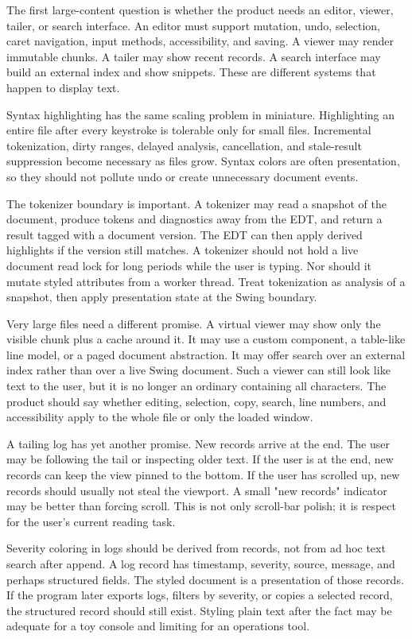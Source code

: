 The first large-content question is whether the product needs an editor, viewer, tailer, or search interface. An editor must support mutation, undo, selection, caret navigation, input methods, accessibility, and saving. A viewer may render immutable chunks. A tailer may show recent records. A search interface may build an external index and show snippets. These are different systems that happen to display text.

Syntax highlighting has the same scaling problem in miniature. Highlighting an entire file after every keystroke is tolerable only for small files. Incremental tokenization, dirty ranges, delayed analysis, cancellation, and stale-result suppression become necessary as files grow. Syntax colors are often presentation, so they should not pollute undo or create unnecessary document events.

The tokenizer boundary is important. A tokenizer may read a snapshot of the
document, produce tokens and diagnostics away from the EDT, and return a result
tagged with a document version. The EDT can then apply derived highlights if
the version still matches. A tokenizer should not hold a live document read lock
for long periods while the user is typing. Nor should it mutate styled
attributes from a worker thread. Treat tokenization as analysis of a snapshot,
then apply presentation state at the Swing boundary.

Very large files need a different promise. A virtual viewer may show only the
visible chunk plus a cache around it. It may use a custom component, a table-like
line model, or a paged document abstraction. It may offer search over an
external index rather than over a live Swing document. Such a viewer can still
look like text to the user, but it is no longer an ordinary 
containing all characters. The product should say whether editing, selection,
copy, search, line numbers, and accessibility apply to the whole file or only
the loaded window.

A tailing log has yet another promise. New records arrive at the end. The user
may be following the tail or inspecting older text. If the user is at the end,
new records can keep the view pinned to the bottom. If the user has scrolled
up, new records should usually not steal the viewport. A small "new records"
indicator may be better than forcing scroll. This is not only scroll-bar
polish; it is respect for the user's current reading task.

Severity coloring in logs should be derived from records, not from ad hoc text
search after append. A log record has timestamp, severity, source, message, and
perhaps structured fields. The styled document is a presentation of those
records. If the program later exports logs, filters by severity, or copies a
selected record, the structured record should still exist. Styling plain text
after the fact may be adequate for a toy console and limiting for an operations
tool.

